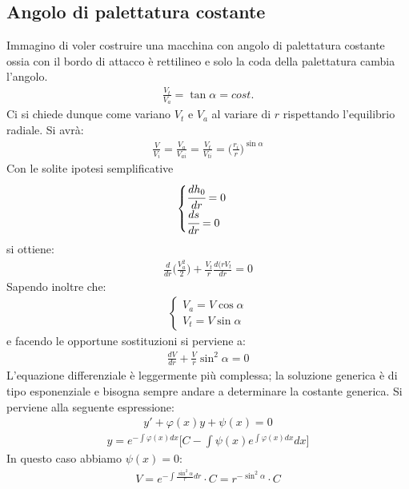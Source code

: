 \subsection{Angolo di palettatura costante}
Immagino di voler costruire una macchina con angolo di palettatura costante ossia con il bordo di attacco è rettilineo e solo la coda della palettatura cambia l'angolo.
\begin{align*}
\frac{V_t}{V_a} = \tan \alpha = cost.
\end{align*}
Ci si chiede dunque come variano $V_t$ e $V_a$ al variare di $r$ rispettando l'equilibrio radiale.
Si avrà:
\begin{align*}
\frac{V}{V_i} = \frac{V_a}{V_{ai}} = \frac{V_t}{V_{ti}} = \bigg(\frac{r_i}{r} \bigg)^{\sin \alpha}
\end{align*}
Con le solite ipotesi semplificative
\begin{align*}
\begin{cases}
\cfrac{dh_0}{dr} = 0\\
\cfrac{ds}{dr} = 0 
\end{cases}
\end{align*}
si ottiene:
\begin{align*}
\frac{d}{dr} \bigg(\frac{V_a^2}{2} \bigg) + \frac{V_t}{r} \frac{d(rV_t}{dr} = 0
\end{align*}
Sapendo inoltre che:
\begin{align*}
\begin{cases}
V_a = V \cos \alpha\\
V_t = V \sin \alpha
\end{cases}
\end{align*}
e facendo le opportune sostituzioni si perviene a:
\begin{align*}
\frac{dV}{dr} + \frac{V}{r} \sin^2 \alpha = 0
\end{align*}
L'equazione differenziale è leggermente più complessa; la soluzione generica è di tipo esponenziale e bisogna sempre andare a determinare la costante generica. Si perviene alla seguente espressione:
\begin{align*}
y' + \varphi(x)y + \psi(x) = 0 
\end{align*}
\begin{align*}
y = e^{-\int \varphi(x)dx} \bigg[ C- \int \psi(x) e^{\int \varphi(x)dx} dx \bigg] 
\end{align*}
In questo caso abbiamo $\psi(x) = 0$:
\begin{align*}
V = e^{-\int \frac{\sin^2 \alpha}{r}dr}\cdot C = r^{-\sin^2 \alpha} \cdot C
\end{align*}
